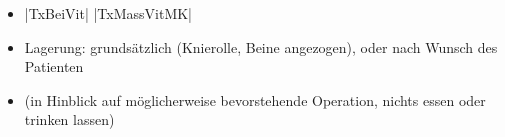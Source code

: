 \label{m:am-abdominalerkrankungen}
\begin{itemize}
  \item {} |TxBeiVit|
  |TxMassVitMK|
  \item Lagerung: grundsätzlich 
  (Knierolle, Beine angezogen), oder nach Wunsch des Patienten
  \item {} (in Hinblick auf möglicherweise
  bevorstehende Operation, nichts essen oder trinken lassen)
\end{itemize}